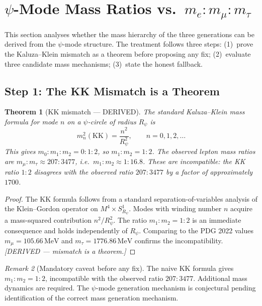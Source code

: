 \documentclass[12pt,a4paper]{article}
\newtheorem{theorem}{Theorem}[section]
\theoremstyle{remark}
\newtheorem{remark}[theorem]{Remark}
\begin{document}
\section{$\psi$-Mode Mass Ratios vs.\ $m_e : m_\mu : m_\tau$}
\label{sec:mass_ratios}

This section analyses whether the mass hierarchy of the three generations
can be derived from the $\psi$-mode structure.  The treatment follows three
steps: (1)~prove the Kaluza--Klein mismatch as a theorem before proposing any
fix; (2)~evaluate three candidate mass mechanisms; (3)~state the honest
fallback.

\subsection{Step 1: The KK Mismatch is a Theorem}
\label{subsec:kk_mismatch}

\begin{theorem}[KK mismatch — DERIVED]
  \label{thm:kk_mismatch}
  The standard Kaluza--Klein mass formula for mode $n$ on a $\psi$-circle
  of radius $R_\psi$ is
  \[
    m_n^2(\mathrm{KK}) = \frac{n^2}{R_\psi^2},
    \qquad n = 0, 1, 2, \ldots
    \tag{KK}
  \]
  This gives $m_0 : m_1 : m_2 = 0 : 1 : 2$, so $m_1 : m_2 = 1 : 2$.
  The observed lepton mass ratios are $m_\mu : m_\tau \approx 207 : 3477$,
  i.e.\ $m_1 : m_2 \approx 1 : 16.8$.
  These are incompatible: the KK ratio $1{:}2$ disagrees with the observed
  ratio $207{:}3477$ by a factor of approximately $1700$.
\end{theorem}

\begin{proof}
  The KK formula follows from a standard separation-of-variables analysis
  of the Klein--Gordon operator on $M^4 \times S^1_{R_\psi}$.  Modes with
  winding number $n$ acquire a mass-squared contribution $n^2/R_\psi^2$.
  The ratio $m_1 : m_2 = 1 : 2$ is an immediate consequence and holds
  independently of $R_\psi$.  Comparing to the PDG 2022 values
  $m_\mu = 105.66\,\text{MeV}$ and $m_\tau = 1776.86\,\text{MeV}$ confirms
  the incompatibility.  \emph{[DERIVED --- mismatch is a theorem.]}
\end{proof}

\begin{remark}[Mandatory caveat before any fix]
  The naive KK formula gives $m_1 : m_2 = 1 : 2$, incompatible with the
  observed ratio $207 : 3477$.  Additional mass dynamics are required.
  The $\psi$-mode generation mechanism is conjectural pending identification
  of the correct mass generation mechanism.
\end{remark}
\end{document}
